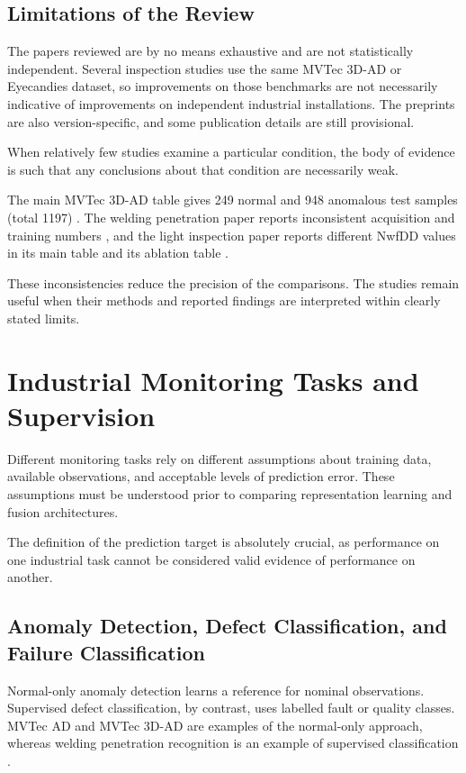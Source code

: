 \subsection{Limitations of the Review}

The papers reviewed are by no means exhaustive and are not statistically independent. Several
inspection studies use the same MVTec 3D-AD or Eyecandies dataset, so improvements on those
benchmarks are not necessarily indicative of improvements on independent industrial installations.
The preprints are also version-specific, and some publication details are still provisional.

When relatively few studies examine a particular condition, the body of evidence is such that any
conclusions about that condition are necessarily weak.

The main MVTec 3D-AD table gives 249 normal and 948 anomalous test samples (total 1197)
\parencite[Table~1]{Bergmann2022The}. The welding penetration paper reports inconsistent acquisition and
training numbers \parencite[pp.~6708, 6711]{Hua2026Weld}, and the light inspection paper reports different NwfDD values in its main table
and its ablation table \parencite[Tables~IV, VI--VII]{P035}.

These inconsistencies reduce the precision of the comparisons. The studies remain useful when their
methods and reported findings are interpreted within clearly stated limits.

\section{Industrial Monitoring Tasks and Supervision}

Different monitoring tasks rely on different assumptions about training data, available
observations, and acceptable levels of prediction error. These assumptions must be understood prior
to comparing representation learning and fusion architectures.

The definition of the prediction target is absolutely crucial, as performance on one industrial task
cannot be considered valid evidence of performance on another.

\subsection{Anomaly Detection, Defect Classification, and Failure Classification}

Normal-only anomaly detection learns a reference for nominal observations. Supervised defect
classification, by contrast, uses labelled fault or quality classes. MVTec AD and MVTec 3D-AD are
examples of the normal-only approach, whereas welding penetration recognition is an example of
supervised classification \parencite{Bergmann2019MVTec,Bergmann2022The,Hua2026Weld}.

